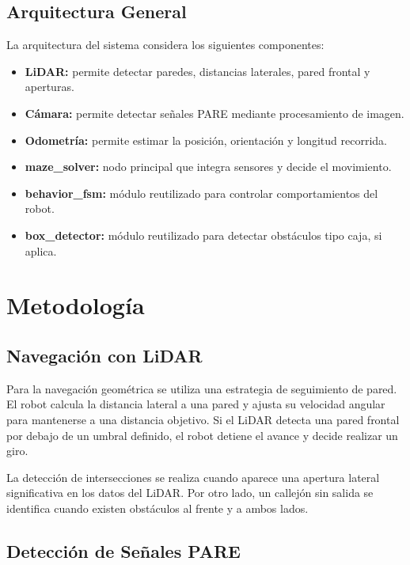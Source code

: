 \documentclass[conference]{IEEEtran}
\begin{document}
\subsection{Arquitectura General}

La arquitectura del sistema considera los siguientes componentes:

\begin{itemize}
    \item \textbf{LiDAR:} permite detectar paredes, distancias laterales, pared frontal y aperturas.
    \item \textbf{Cámara:} permite detectar señales PARE mediante procesamiento de imagen.
    \item \textbf{Odometría:} permite estimar la posición, orientación y longitud recorrida.
    \item \textbf{maze\_solver:} nodo principal que integra sensores y decide el movimiento.
    \item \textbf{behavior\_fsm:} módulo reutilizado para controlar comportamientos del robot.
    \item \textbf{box\_detector:} módulo reutilizado para detectar obstáculos tipo caja, si aplica.
\end{itemize}

\section{Metodología}

\subsection{Navegación con LiDAR}

Para la navegación geométrica se utiliza una estrategia de seguimiento de pared. El robot calcula la distancia lateral a una pared y ajusta su velocidad angular para mantenerse a una distancia objetivo. Si el LiDAR detecta una pared frontal por debajo de un umbral definido, el robot detiene el avance y decide realizar un giro.

La detección de intersecciones se realiza cuando aparece una apertura lateral significativa en los datos del LiDAR. Por otro lado, un callejón sin salida se identifica cuando existen obstáculos al frente y a ambos lados.

\subsection{Detección de Señales PARE}
\end{document}
